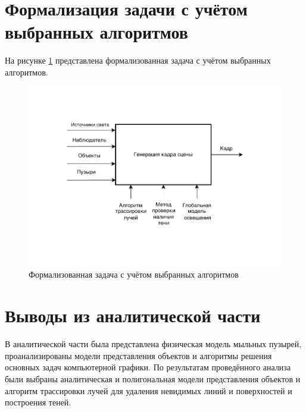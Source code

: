 \clearpage

\section{Формализация задачи с учётом выбранных алгоритмов}

На рисунке \ref{img:idef0_form_algo} представлена формализованная задача с учётом выбранных алгоритмов.

\begin{figure}[h]
	\begin{center}
		\includegraphics[width=\linewidth]{img/idef0_form_algo.pdf}
	\end{center}
	\captionsetup{justification=centering}
	\caption{Формализованная задача с учётом выбранных алгоритмов}
	\label{img:idef0_form_algo}
\end{figure}


\section{Выводы из аналитической части}

В аналитической части была представлена физическая модель мыльных пузырей, проанализированы модели представления объектов и алгоритмы решения основных задач компьютерной графики. По результатам проведённого анализа были выбраны аналитическая и полигональная модели представления объектов и алгоритм трассировки лучей для удаления невидимых линий и поверхностей и построения теней.

